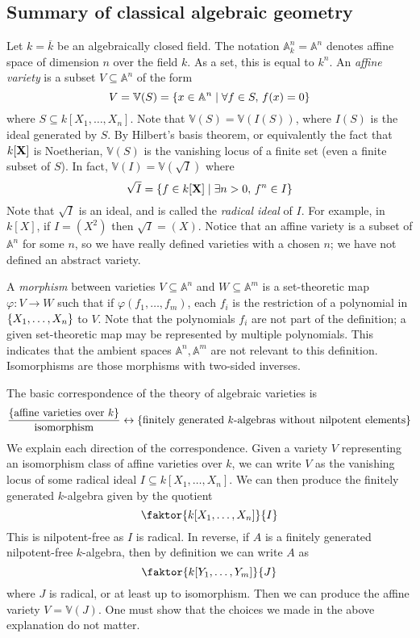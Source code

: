 \subsection{Summary of classical algebraic geometry}
Let \( k = \overline k \) be an algebraically closed field.
The notation \( \mathbb A^n_k = \mathbb A^n \) denotes affine space of dimension \( n \) over the field \( k \).
As a set, this is equal to \( k^n \).
An \emph{affine variety} is a subset \( V \subseteq \mathbb A^n \) of the form
\[ V = \mathbb V(S) = \qty{x \in \mathbb A^n \mid \forall f \in S,\, f(x) = 0} \]
where \( S \subseteq k[X_1, \dots, X_n] \).
Note that \( \mathbb V(S) = \mathbb V(I(S)) \), where \( I(S) \) is the ideal generated by \( S \).
By Hilbert's basis theorem, or equivalently the fact that \( k[\vb X] \) is Noetherian, \( \mathbb V(S) \) is the vanishing locus of a finite set (even a finite subset of \( S \)).
In fact, \( \mathbb V(I) = \mathbb V(\sqrt{I}) \) where
\[ \sqrt{I} = \qty{f \in k[\vb X] \mid \exists n > 0,\, f^n \in I} \]
Note that \( \sqrt{I} \) is an ideal, and is called the \emph{radical ideal} of \( I \).
For example, in \( k[X] \), if \( I = (X^2) \) then \( \sqrt{I} = (X) \).
Notice that an affine variety is a subset of \( \mathbb A^n \) for some \( n \), so we have really defined varieties with a chosen \( n \); we have not defined an abstract variety.

A \emph{morphism} between varieties \( V \subseteq \mathbb A^n \) and \( W \subseteq \mathbb A^m \) is a set-theoretic map \( \varphi : V \to W \) such that if \( \varphi(f_1, \dots, f_m) \), each \( f_i \) is the restriction of a polynomial in \( \qty{X_1, \dots, X_n} \) to \( V \).
Note that the polynomials \( f_i \) are not part of the definition; a given set-theoretic map may be represented by multiple polynomials.
This indicates that the ambient spaces \( \mathbb A^n, \mathbb A^m \) are not relevant to this definition.
Isomorphisms are those morphisms with two-sided inverses.

The basic correspondence of the theory of algebraic varieties is
\[ \frac{\qty{\text{affine varieties over } k}}{\text{isomorphism}} \leftrightarrow \qty{\text{finitely generated \( k \)-algebras without nilpotent elements}} \]
We explain each direction of the correspondence.
Given a variety \( V \) representing an isomorphism class of affine varieties over \( k \), we can write \( V \) as the vanishing locus of some radical ideal \( I \subseteq k[X_1, \dots, X_n] \).
We can then produce the finitely generated \( k \)-algebra given by the quotient
\[ \faktor{k[X_1, \dots, X_n]}{I} \]
This is nilpotent-free as \( I \) is radical.
In reverse, if \( A \) is a finitely generated nilpotent-free \( k \)-algebra, then by definition we can write \( A \) as
\[ \faktor{k[Y_1, \dots, Y_m]}{J} \]
where \( J \) is radical, or at least up to isomorphism.
Then we can produce the affine variety \( V = \mathbb V(J) \).
One must show that the choices we made in the above explanation do not matter.

